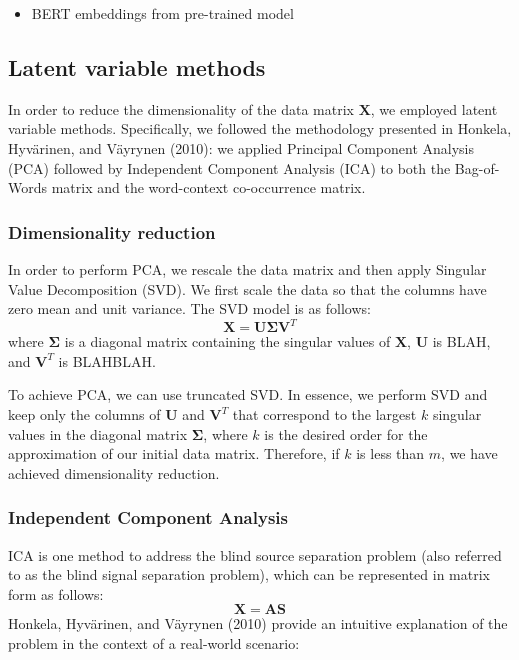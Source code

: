 \documentclass{article}
\begin{document}
\begin{itemize}
\tightlist
\item
  BERT embeddings from pre-trained model
\end{itemize}

\hypertarget{latent-variable-methods}{%
\subsection{Latent variable methods}\label{latent-variable-methods}}

In order to reduce the dimensionality of the data matrix \(\mathbf{X}\),
we employed latent variable methods. Specifically, we followed the
methodology presented in Honkela, Hyvärinen, and Väyrynen (2010): we
applied Principal Component Analysis (PCA) followed by Independent
Component Analysis (ICA) to both the Bag-of-Words matrix and the
word-context co-occurrence matrix.

\hypertarget{dimensionality-reduction}{%
\subsubsection{Dimensionality
reduction}\label{dimensionality-reduction}}

In order to perform PCA, we rescale the data matrix and then apply
Singular Value Decomposition (SVD). We first scale the data so that the
columns have zero mean and unit variance. The SVD model is as follows:
\[\mathbf{X = U \Sigma V}^T\] where \(\mathbf{\Sigma}\) is a diagonal
matrix containing the singular values of \(\mathbf{X}\), \(\mathbf{U}\)
is BLAH, and \(\mathbf{V}^T\) is BLAHBLAH.

To achieve PCA, we can use truncated SVD. In essence, we perform SVD and
keep only the columns of \(\mathbf{U}\) and \(\mathbf{V}^T\) that
correspond to the largest \(k\) singular values in the diagonal matrix
\(\mathbf{\Sigma}\), where \(k\) is the desired order for the
approximation of our initial data matrix. Therefore, if \(k\) is less
than \(m\), we have achieved dimensionality reduction.

\hypertarget{independent-component-analysis}{%
\subsubsection{Independent Component
Analysis}\label{independent-component-analysis}}

ICA is one method to address the blind source separation problem (also
referred to as the blind signal separation problem), which can be
represented in matrix form as follows: \[\mathbf{X = AS}\] Honkela,
Hyvärinen, and Väyrynen (2010) provide an intuitive explanation of the
problem in the context of a real-world scenario:
\end{document}
